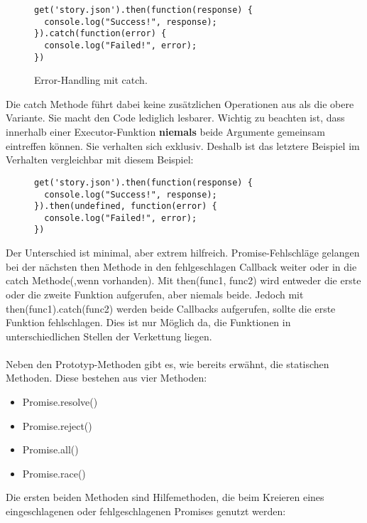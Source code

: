 \begin{figure}[H]
\begin{lstlisting}
get('story.json').then(function(response) {
  console.log("Success!", response);
}).catch(function(error) {
  console.log("Failed!", error);
})
\end{lstlisting}
\caption{Error-Handling mit catch. \cite{callback-vs-promises}}
\end{figure}

\noindent
Die catch Methode führt dabei keine zusätzlichen Operationen aus als die obere Variante. Sie macht den Code lediglich lesbarer. Wichtig zu beachten ist, dass innerhalb einer Executor-Funktion \textbf{niemals} beide Argumente gemeinsam eintreffen können. Sie verhalten sich exklusiv. Deshalb ist das letztere Beispiel im Verhalten vergleichbar mit diesem Beispiel:

\begin{figure}[H]
\begin{lstlisting}
get('story.json').then(function(response) {
  console.log("Success!", response);
}).then(undefined, function(error) {
  console.log("Failed!", error);
})
\end{lstlisting}
\end{figure}

\noindent
Der Unterschied ist minimal, aber extrem hilfreich. Promise-Fehlschläge gelangen bei der nächsten then Methode in den fehlgeschlagen Callback weiter oder in die catch Methode(,wenn vorhanden). Mit then(func1, func2) wird entweder die erste oder die zweite Funktion aufgerufen, aber niemals beide. Jedoch mit then(func1).catch(func2) werden beide Callbacks aufgerufen, sollte die erste Funktion fehlschlagen. Dies ist nur Möglich da, die Funktionen in unterschiedlichen Stellen der Verkettung liegen.\\\\

\noindent
Neben den Prototyp-Methoden gibt es, wie bereits erwähnt, die statischen Methoden. Diese bestehen aus vier Methoden:

\begin{itemize}
\item Promise.resolve()
\item Promise.reject()
\item Promise.all()
\item Promise.race() 
\end{itemize}

\noindent
Die ersten beiden Methoden sind Hilfemethoden, die beim Kreieren eines eingeschlagenen oder fehlgeschlagenen Promises genutzt werden:

